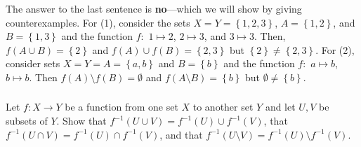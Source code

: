 \documentclass{amsart}
\theoremstyle{definition}
\newcommand{\set}[1]{\left\{#1\right\}}
\begin{document}
The answer to the last sentence is \textbf{no}---which we will show by giving counterexamples. For (1), consider the sets $X=Y=\set{1,2,3}$, $A=\set{1,2}$, and $B=\set{1,3}$ and the function $f:$ $1\mapsto 2$, $2\mapsto 3$, and $3\mapsto 3$. Then, $f(A\cup B)=\set{2}$ and $f(A)\cup f(B)=\set{2,3}$ but $\set{2}\neq\set{2,3}$. For (2), consider sets $X=Y=A=\set{a,b}$ and $B=\set{b}$ and the function $f:$ $a\mapsto b$, $b\mapsto b$. Then $f(A)\setminus f(B)=\emptyset$ and $f(A\setminus B)=\set{b}$ but $\emptyset\neq\set{b}$. \\


\subsubsection{} Let $f:X\to Y$ be a function from one set $X$ to another set $Y$ and let $U,V$ be subsets of $Y$. Show that $f^{-1}(U\cup V)=f^{-1}(U)\cup f^{-1}(V)$, that $f^{-1}(U\cap V)=f^{-1}(U)\cap f^{-1}(V)$, and that $f^{-1}(U\setminus V)=f^{-1}(U)\setminus f^{-1}(V)$. \\
\end{document}

